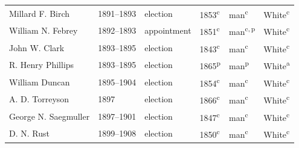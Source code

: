 \begin{longtable}{Q}
Millard F. Birch & 1891--1893 & election & 1853\textsuperscript{c} & man\textsuperscript{c} & White\textsuperscript{c} \\*
William N. Febrey & 1892--1893 & appointment & 1851\textsuperscript{c} & man\textsuperscript{c,\,p} & White\textsuperscript{c} \\
John W. Clark & 1893--1895 & election & 1843\textsuperscript{c} & man\textsuperscript{c} & White\textsuperscript{c} \\
R. Henry Phillips & 1893--1895 & election & 1865\textsuperscript{p} & man\textsuperscript{p} & White\textsuperscript{a} \\
William Duncan & 1895--1904 & election & 1854\textsuperscript{c} & man\textsuperscript{c} & White\textsuperscript{c} \\
A. D. Torreyson & 1897 & election & 1866\textsuperscript{c} & man\textsuperscript{c} & White\textsuperscript{c} \\
George N. Saegmuller & 1897--1901 & election & 1847\textsuperscript{c} & man\textsuperscript{c} & White\textsuperscript{c} \\*
D. N. Rust & 1899--1908 & election & 1850\textsuperscript{c} & man\textsuperscript{c} & White\textsuperscript{c} \\
\end{longtable}\par
\smallskip\noindent{}
\endgroup
\clearpage\begingroup
{}
\medskip
\footnotesize\setlength{\tabcolsep}{8pt}\setlength{\LTpre}{0pt}\setlength{\LTpost}{0pt}
\settowidth{\rcA}{Matthew D. "Matt" de Ferranti}
\settowidth{\rcB}{1870--1873}
\settowidth{\rcC}{special election}
\setlength{\rcslack}{\dimexpr(\textwidth-0.5pt-\rcA-\rcB-\rcC-\rcD-\rcE-\rcF-10\tabcolsep)/5\relax}
\addtolength{\rcA}{\rcslack}
\addtolength{\rcB}{\rcslack}
\addtolength{\rcC}{\rcslack}
\addtolength{\rcD}{\rcslack}
\addtolength{\rcE}{\rcslack}
